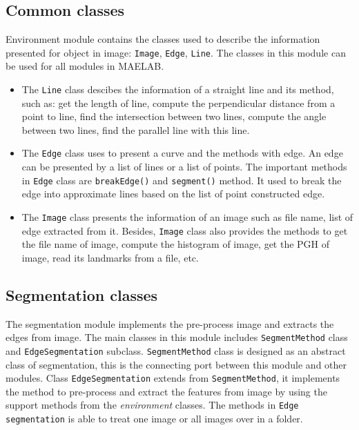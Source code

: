 \subsection*{Common classes}
Environment module contains the classes used to describe the information presented for object in image: \texttt{Image}, \texttt{Edge}, \texttt{Line}. The classes in this module can be used for all modules in MAELAB.
\begin{itemize}
\item The \texttt{Line} class descibes the information of a straight line and its method, such as: get the length of line, compute the perpendicular distance from a point to line, find the intersection between two lines, compute the angle between two lines, find the parallel line with this line.
\item The \texttt{Edge} class uses to present a curve and the methods with edge. An edge can be presented by a list of lines or a list of points. The important methods in \texttt{Edge} class are \texttt{breakEdge()} and \texttt{segment()} method. It used to break the edge into approximate lines based on the list of point constructed edge.
\item The \texttt{Image} class presents the information of an image such as file name, list of edge extracted from it. Besides, \texttt{Image} class also provides the methods to get the file name of image, compute the histogram of image, get the PGH of image, read its landmarks from a file, etc.
\end{itemize}
\subsection{Segmentation classes}
The segmentation module implements the pre-process image and extracts the edges from image. The main classes in this module includes \texttt{SegmentMethod} class and \texttt{EdgeSegmentation} subclass. \texttt{SegmentMethod} class is designed as an abstract class of segmentation, this is the connecting port between this module and other modules. Class \texttt{EdgeSegmentation} extends from \texttt{SegmentMethod}, it implements the method to pre-process and extract the features from image by using the support methods from the \textit{environment} classes. The methods in \texttt{Edge segmentation} is able to treat one image or all images over in a folder.
